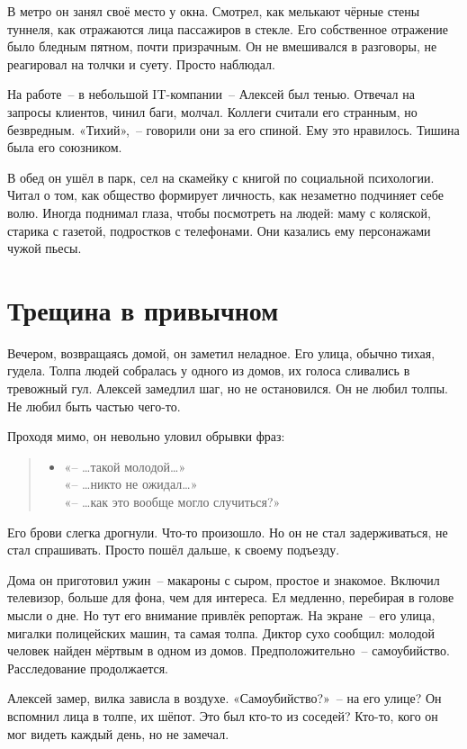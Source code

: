\documentclass[12pt,a4paper]{book}
\newenvironment{dialogue}{\begin{quote}\itshape\begin{itemize}\item[]}{\end{itemize}\end{quote}}
\begin{document}
В метро он занял своё место у окна. Смотрел, как мелькают чёрные стены туннеля, как отражаются лица пассажиров в стекле. Его собственное отражение было бледным пятном, почти призрачным. Он не вмешивался в разговоры, не реагировал на толчки и суету. Просто наблюдал.

На работе~-- в небольшой IT-компании~-- Алексей был тенью. Отвечал на запросы клиентов, чинил баги, молчал. Коллеги считали его странным, но безвредным. «Тихий»,~-- говорили они за его спиной. Ему это нравилось. Тишина была его союзником.

В обед он ушёл в парк, сел на скамейку с книгой по социальной психологии. Читал о том, как общество формирует личность, как незаметно подчиняет себе волю. Иногда поднимал глаза, чтобы посмотреть на людей: маму с коляской, старика с газетой, подростков с телефонами. Они казались ему персонажами чужой пьесы.

\section{Трещина в привычном}

Вечером, возвращаясь домой, он заметил неладное. Его улица, обычно тихая, гудела. Толпа людей собралась у одного из домов, их голоса сливались в тревожный гул. Алексей замедлил шаг, но не остановился. Он не любил толпы. Не любил быть частью чего-то.

Проходя мимо, он невольно уловил обрывки фраз:

\begin{dialogue}
«-- \ldots такой молодой\ldots»\\[0.5em]
«-- \ldots никто не ожидал\ldots»\\[0.5em]
«-- \ldots как это вообще могло случиться?»
\end{dialogue}

Его брови слегка дрогнули. Что-то произошло. Но он не стал задерживаться, не стал спрашивать. Просто пошёл дальше, к своему подъезду.

Дома он приготовил ужин~-- макароны с сыром, простое и знакомое. Включил телевизор, больше для фона, чем для интереса. Ел медленно, перебирая в голове мысли о дне. Но тут его внимание привлёк репортаж. На экране~-- его улица, мигалки полицейских машин, та самая толпа. Диктор сухо сообщил: молодой человек найден мёртвым в одном из домов. Предположительно~-- самоубийство. Расследование продолжается.

Алексей замер, вилка зависла в воздухе. «Самоубийство?»~-- на его улице? Он вспомнил лица в толпе, их шёпот. Это был кто-то из соседей? Кто-то, кого он мог видеть каждый день, но не замечал.
\end{document}
